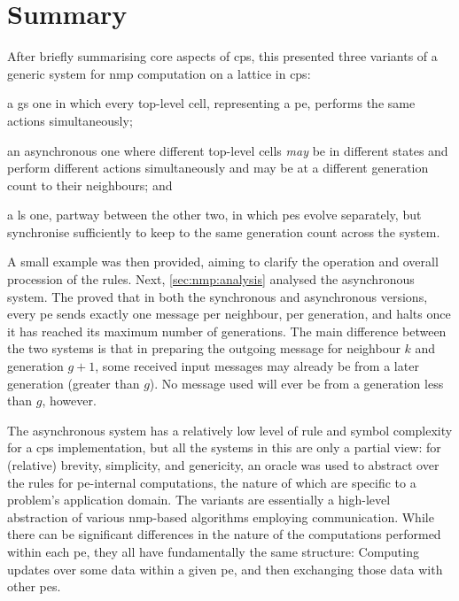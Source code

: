 \section{Summary}
After briefly summarising core aspects of \gls{cps}, this  presented three variants of a generic system for \gls{nmp} computation on a lattice in \gls{cps}:
\begin{inparaenum}[(i)]
\item a \gls{gs} one in which every top-level cell, representing a \gls{pe}, performs the same actions simultaneously;
\item an asynchronous one where different top-level cells \emph{may} be in different states and perform different actions simultaneously and may be at a different generation count to their neighbours; and
\item a \gls{ls} one, partway between the other two, in which \glspl{pe} evolve separately, but synchronise sufficiently to keep to the same generation count across the system.
\end{inparaenum}

A small example was then provided, aiming to clarify the operation and overall procession of the rules.  Next, \cref{sec:nmp:analysis} analysed the asynchronous system.  The  proved that in both the synchronous and asynchronous versions, every \gls{pe} sends exactly one message per neighbour, per generation, and halts once it has reached its maximum number of generations.  The main difference between the two systems is that in preparing the outgoing message for neighbour \(k\) and generation \(g + 1\), some received input messages may already be from a later generation (greater than \(g\)).  No message used will ever be from a generation less than \(g\), however.

The asynchronous system has a relatively low level of rule and symbol complexity for a \gls{cps} implementation, but all the systems in this  are only a partial view:  for (relative) brevity, simplicity, and genericity, an oracle was used to abstract over the rules for \gls{pe}-internal computations, the nature of which are specific to a problem's application domain.  The variants are essentially a high-level abstraction of various \gls{nmp}-based algorithms employing communication.  While there can be significant differences in the nature of the computations performed within each \gls{pe}, they all have fundamentally the same structure:  Computing updates over some data within a given \gls{pe}, and then exchanging those data with other \glspl{pe}.


